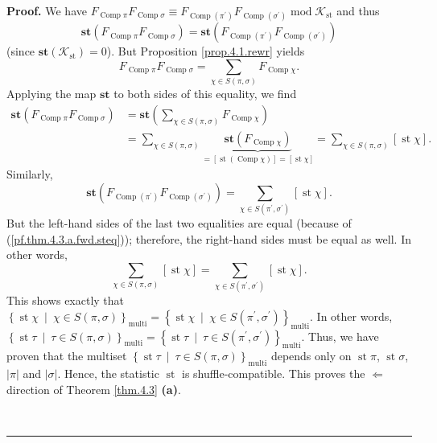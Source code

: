 \documentclass[numbers=enddot,12pt,final,onecolumn,notitlepage]{scrartcl}%
\theoremstyle{definition}
\newenvironment{proof}[1][Proof]{\noindent\textbf{#1.} }{\ \rule{0.5em}{0.5em}}
\newenvironment{verlong}{}{}
\let\sumnonlimits\sum
\renewcommand{\sum}{\sumnonlimits\limits}
\begin{document}
\begin{verlong}
\begin{proof}
We have $F_{\operatorname*{Comp}\pi}F_{\operatorname*{Comp}\sigma}\equiv
F_{\operatorname*{Comp}\left(  \pi^{\prime}\right)  }F_{\operatorname*{Comp}%
\left(  \sigma^{\prime}\right)  }\operatorname{mod}\mathcal{K}%
_{\operatorname{st}}$ and thus%
\begin{equation}
\mathbf{st}\left(  F_{\operatorname*{Comp}\pi}F_{\operatorname*{Comp}\sigma
}\right)  =\mathbf{st}\left(  F_{\operatorname*{Comp}\left(  \pi^{\prime
}\right)  }F_{\operatorname*{Comp}\left(  \sigma^{\prime}\right)  }\right)
\label{pf.thm.4.3.a.fwd.steq}%
\end{equation}
(since $\mathbf{st}\left(  \mathcal{K}_{\operatorname{st}}\right)  =0$). But
Proposition \ref{prop.4.1.rewr} yields%
\[
F_{\operatorname*{Comp}\pi}F_{\operatorname*{Comp}\sigma}=\sum_{\chi\in
S\left(  \pi,\sigma\right)  }F_{\operatorname*{Comp}\chi}.
\]
Applying the map $\mathbf{st}$ to both sides of this equality, we find%
\begin{align*}
\mathbf{st}\left(  F_{\operatorname*{Comp}\pi}F_{\operatorname*{Comp}\sigma
}\right)   &  =\mathbf{st}\left(  \sum_{\chi\in S\left(  \pi,\sigma\right)
}F_{\operatorname*{Comp}\chi}\right) \\
&  =\sum_{\chi\in S\left(  \pi,\sigma\right)  }\underbrace{\mathbf{st}\left(
F_{\operatorname*{Comp}\chi}\right)  }_{=\left[  \operatorname{st}\left(
\operatorname*{Comp}\chi\right)  \right]  =\left[  \operatorname{st}%
\chi\right]  }=\sum_{\chi\in S\left(  \pi,\sigma\right)  }\left[
\operatorname{st}\chi\right]  .
\end{align*}
Similarly,%
\[
\mathbf{st}\left(  F_{\operatorname*{Comp}\left(  \pi^{\prime}\right)
}F_{\operatorname*{Comp}\left(  \sigma^{\prime}\right)  }\right)  =\sum
_{\chi\in S\left(  \pi^{\prime},\sigma^{\prime}\right)  }\left[
\operatorname{st}\chi\right]  .
\]
But the left-hand sides of the last two equalities are equal (because of
(\ref{pf.thm.4.3.a.fwd.steq})); therefore, the right-hand sides must be equal
as well. In other words,
\[
\sum_{\chi\in S\left(  \pi,\sigma\right)  }\left[  \operatorname{st}%
\chi\right]  =\sum_{\chi\in S\left(  \pi^{\prime},\sigma^{\prime}\right)
}\left[  \operatorname{st}\chi\right]  .
\]
This shows exactly that $\left\{  \operatorname{st} \chi
\ \mid\ \chi\in S\left(  \pi,\sigma\right)  \right\}  _{\operatorname*{multi}}
=\left\{  \operatorname{st} \chi \ \mid\ \chi\in S\left(
\pi^{\prime},\sigma^{\prime}\right)  \right\}  _{\operatorname*{multi}} $. In
other words, $\left\{  \operatorname{st} \tau   \ \mid\ \tau\in
S\left(  \pi,\sigma\right)  \right\}  _{\operatorname*{multi}} =\left\{
\operatorname{st} \tau   \ \mid\ \tau\in S\left(  \pi^{\prime
},\sigma^{\prime}\right)  \right\}  _{\operatorname*{multi}} $. Thus, we have
proven that the multiset $\left\{  \operatorname{st} \tau 
\ \mid\ \tau\in S\left(  \pi,\sigma\right)  \right\}  _{\operatorname*{multi}}
$ depends only on $\operatorname{st} \pi   $,
$\operatorname{st} \sigma   $, $\left\vert \pi\right\vert $ and
$\left\vert \sigma\right\vert $. Hence, the statistic $\operatorname{st}$ is
shuffle-compatible. This proves the $\Longleftarrow$ direction of Theorem
\ref{thm.4.3} \textbf{(a)}.


\end{proof}
\end{verlong}
\end{document}
